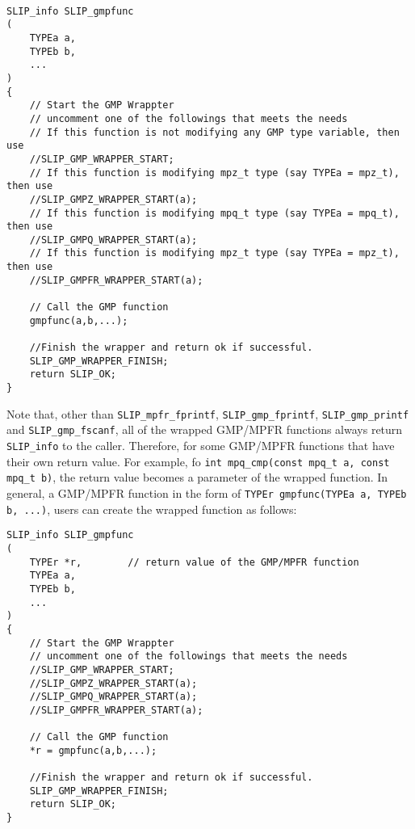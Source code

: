 \documentclass[12pt]{article}
\theoremstyle{definition}
\begin{document}
\begin{mdframed}[userdefinedwidth=6in]
{\footnotesize
\begin{verbatim}

SLIP_info SLIP_gmpfunc
(
    TYPEa a,
    TYPEb b,
    ...
)
{
    // Start the GMP Wrappter
    // uncomment one of the followings that meets the needs
    // If this function is not modifying any GMP type variable, then use
    //SLIP_GMP_WRAPPER_START;
    // If this function is modifying mpz_t type (say TYPEa = mpz_t), then use
    //SLIP_GMPZ_WRAPPER_START(a);
    // If this function is modifying mpq_t type (say TYPEa = mpq_t), then use
    //SLIP_GMPQ_WRAPPER_START(a);
    // If this function is modifying mpz_t type (say TYPEa = mpz_t), then use
    //SLIP_GMPFR_WRAPPER_START(a);

    // Call the GMP function
    gmpfunc(a,b,...);

    //Finish the wrapper and return ok if successful.
    SLIP_GMP_WRAPPER_FINISH;
    return SLIP_OK;
}
\end{verbatim}
} \end{mdframed}

Note that, other than \verb|SLIP_mpfr_fprintf|, \verb|SLIP_gmp_fprintf|,
\verb|SLIP_gmp_printf| and \verb|SLIP_gmp_fscanf|, all of the wrapped GMP/MPFR
functions always return \verb|SLIP_info| to the caller. Therefore, for some
GMP/MPFR functions that have their own return value.  For example, fo
\verb|int mpq_cmp(const mpq_t a, const mpq_t b)|, the return value becomes a
parameter of the wrapped function. In general, a GMP/MPFR function in the form
of \verb|TYPEr gmpfunc(TYPEa a, TYPEb b, ...)|, users can create the wrapped
function as follows:

\begin{mdframed}[userdefinedwidth=6in]
{\footnotesize
\begin{verbatim}
SLIP_info SLIP_gmpfunc
(
    TYPEr *r,        // return value of the GMP/MPFR function
    TYPEa a,
    TYPEb b,
    ...
)
{
    // Start the GMP Wrappter
    // uncomment one of the followings that meets the needs
    //SLIP_GMP_WRAPPER_START;
    //SLIP_GMPZ_WRAPPER_START(a);
    //SLIP_GMPQ_WRAPPER_START(a);
    //SLIP_GMPFR_WRAPPER_START(a);

    // Call the GMP function
    *r = gmpfunc(a,b,...);

    //Finish the wrapper and return ok if successful.
    SLIP_GMP_WRAPPER_FINISH;
    return SLIP_OK;
}
\end{verbatim}
} \end{mdframed}
\end{document}
